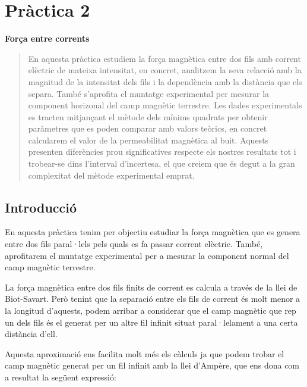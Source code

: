 \documentclass[11pt]{article}
\numberwithin{equation}{section}
\numberwithin{figure}{section}
\numberwithin{table}{section}
\begin{document}
\newpage
\section{\huge \textbf{Pràctica 2}}

{}  %

\vspace{0.5em}  %

{\Huge \textbf{Força entre corrents}}  %

\vspace{1em}  %

\begin{abstract}
    En aquesta pràctica estudiem la força magnètica entre dos fils amb corrent elèctric de mateixa intensitat, en concret, analitzem la seva relacció amb la magnitud de la intensitat dels fils i la dependència amb la distància que els separa. També s'aprofita el muntatge experimental per mesurar la component horizonal del camp magnètic terrestre. Les dades experimentals es tracten mitjançant el mètode dels mínims quadrats per obtenir paràmetres que es poden comparar amb valors teòrics, en concret calcularem el valor de la permeabilitat magnètica al buit. Aquests presenten diferències prou significatives respecte els nostres resultats tot i trobear-se dins l'interval d'incertesa, el que creiem que és degut a la gran complexitat del mètode experimental emprat.
\end{abstract}

\subsection{Introducció}\label{sec: PR2_intro}

En aquesta pràctica tenim per objectiu estudiar la força magnètica que es genera entre dos fils paral·lels pels quals es fa passar corrent elèctric. També, aprofitarem el muntatge experimental per a mesurar la component normal del camp magnètic terrestre.

La força magnètica entre dos fils finits de corrent es calcula a través de la llei de Biot-Savart. Però tenint que la separació entre els fils de corrent és molt menor a la longitud d'aquests, podem arribar a considerar que el camp magnètic que rep un dels fils és el generat per un altre fil infinit situat paral·lelament a una certa distància d'ell. 

Aquesta aproximació ens facilita molt més els càlculs ja que podem trobar el camp magnètic generat per un fil infinit amb la llei d'Ampère, que ens dona com a resultat la següent expressió:
\end{document}
